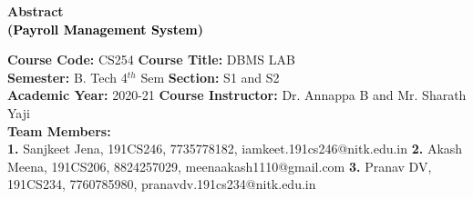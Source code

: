 \documentclass[12pt]{article}
\begin{document}


\begin{center}
    \textbf{\Large{Abstract \\
    (\textcolor{black}{Payroll Management System})}}
\end{center}

\noindent 
\textbf{Course Code:} CS254
\hspace{1.97in} 
\textbf{Course Title:} DBMS LAB \\
\textbf{Semester:} B. Tech 4$^{th}$ Sem 
\hspace{1.59in} 
\textbf{Section:} S1 and S2 \\
\textbf{Academic Year:} 2020-21 
\hspace{1.75in} 
\textbf{Course Instructor:} Dr. Annappa B and Mr. Sharath Yaji \\
\textbf{Team Members:} \\
\textbf{1.} Sanjkeet Jena, 191CS246, 7735778182, iamkeet.191cs246@nitk.edu.in 
\newline
\textbf{2.} Akash Meena, 191CS206, 8824257029, meenaakash1110@gmail.com
\newline
\textbf{3.} Pranav DV, 191CS234, 7760785980, pranavdv.191cs234@nitk.edu.in

\vspace{0.25in}
\end{document}
